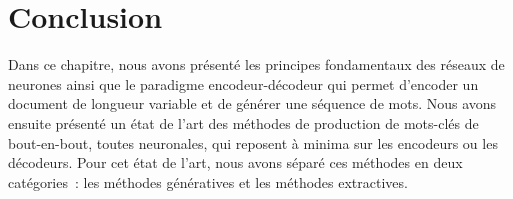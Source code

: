 \section{Conclusion}

%
%
%
%

Dans ce chapitre, nous avons présenté les principes fondamentaux des réseaux de neurones ainsi que le paradigme encodeur-décodeur qui permet d'encoder un document de longueur variable et de générer une séquence de mots.
Nous avons ensuite présenté un état de l'art des méthodes de production de mots-clés de bout-en-bout, toutes neuronales, qui reposent à minima sur les encodeurs ou les décodeurs.
Pour cet état de l'art, nous avons séparé ces méthodes en deux catégories~: les méthodes génératives et les méthodes extractives.



